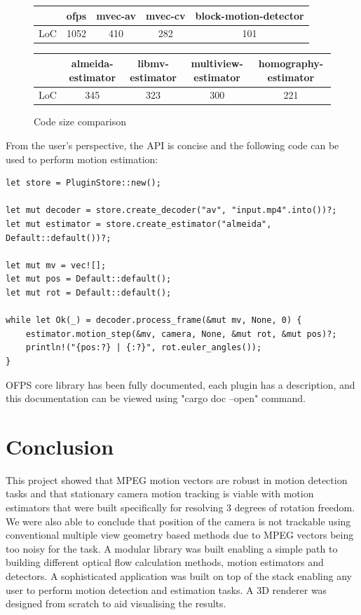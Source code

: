 \documentclass[11pt,english]{report}
\begin{document}
\begin{figure}[!ht]
	\begin{center}
		\begin{tabular}{| c | c | c | c | c |} 
			\hline
			 & ofps & mvec-av & mvec-cv & block-motion-detector \\ [0.5ex] 
			\hline
			LoC & 1052 & 410 & 282 & 101 \\ 
			\hline
		\end{tabular}

		\space

		\begin{tabular}{| c | c | c | c | c |} 
			\hline
			 & almeida-estimator & libmv-estimator & multiview-estimator & homography-estimator \\ [0.5ex] 
			\hline
			LoC & 345 & 323 & 300 & 221 \\ 
			\hline
		\end{tabular}
	\end{center}
	\caption{\centering Code size comparison}
\end{figure}

From the user's perspective, the API is concise and the following code can be used to perform motion estimation:

\begin{verbatim}
let store = PluginStore::new();

let mut decoder = store.create_decoder("av", "input.mp4".into())?;
let mut estimator = store.create_estimator("almeida", Default::default())?;

let mut mv = vec![];
let mut pos = Default::default();
let mut rot = Default::default();

while let Ok(_) = decoder.process_frame(&mut mv, None, 0) {
    estimator.motion_step(&mv, camera, None, &mut rot, &mut pos)?;
    println!("{pos:?} | {:?}", rot.euler_angles());
}
\end{verbatim}

OFPS core library has been fully documented, each plugin has a description, and this documentation can be viewed using "cargo doc --open" command.

\chapter{Conclusion}

This project showed that MPEG motion vectors are robust in motion detection tasks and that stationary camera motion tracking is viable with motion estimators that were built specifically for resolving 3 degrees of rotation freedom. We were also able to conclude that position of the camera is not trackable using conventional multiple view geometry based methods due to MPEG vectors being too noisy for the task. A modular library was built enabling a simple path to building different optical flow calculation methods, motion estimators and detectors. A sophisticated application was built on top of the stack enabling any user to perform motion detection and estimation tasks. A 3D renderer was designed from scratch to aid visualising the results.
\end{document}
